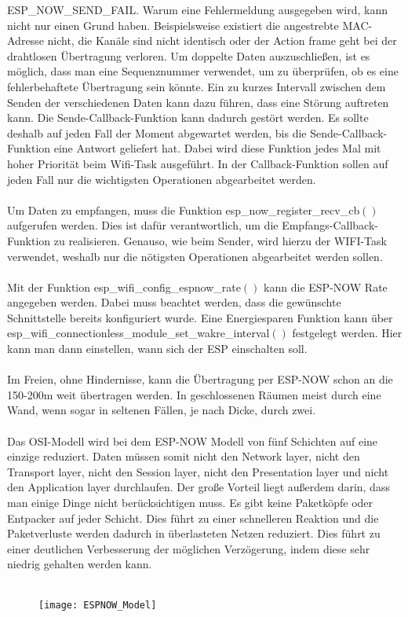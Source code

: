 \documentclass[titlepage,12pt,twoside]{article}
\begin{document}
ESP\_NOW\_SEND\_FAIL. Warum eine Fehlermeldung ausgegeben wird, kann nicht 
nur einen Grund haben. Beispielsweise existiert die angestrebte MAC-Adresse 
nicht, die Kanäle sind nicht identisch oder der Action frame geht bei der 
drahtlosen Übertragung verloren. Um doppelte Daten auszuschließen, ist es 
möglich, dass man eine Sequenznummer verwendet, um zu überprüfen, ob es eine 
fehlerbehaftete Übertragung sein könnte. Ein zu kurzes Intervall zwischen 
dem Senden der verschiedenen Daten kann dazu führen, dass eine Störung 
auftreten kann. Die Sende-Callback-Funktion kann dadurch gestört werden. Es 
sollte deshalb auf jeden Fall der Moment abgewartet werden, bis die Sende-Callback-Funktion 
eine Antwort geliefert hat. Dabei wird diese Funktion jedes Mal mit hoher 
Priorität beim Wifi-Task ausgeführt. In der Callback-Funktion sollen auf 
jeden Fall nur die wichtigsten Operationen abgearbeitet werden. \\
\\
Um Daten zu empfangen, muss die Funktion esp\_now\_register\_recv\_cb$()$ aufgerufen 
werden. Dies ist dafür verantwortlich, um die Empfangs-Callback-Funktion zu 
realisieren. Genauso, wie beim Sender, wird hierzu der WIFI-Task verwendet, 
weshalb nur die nötigsten Operationen abgearbeitet werden sollen. \\
\\
Mit der Funktion esp\_wifi\_config\_espnow\_rate$()$ kann die ESP-NOW Rate angegeben 
werden. Dabei muss beachtet werden, dass die gewünschte Schnittstelle bereits 
konfiguriert wurde. Eine Energiesparen Funktion kann über 
esp\_wifi\_connectionless\_module\_set\_wakre\_interval$()$ festgelegt werden. Hier 
kann man dann einstellen, wann sich der ESP einschalten soll. \\
\\
Im Freien, ohne Hindernisse, kann die Übertragung per ESP-NOW schon an die 
150-200m weit übertragen werden. In geschlossenen Räumen meist durch eine 
Wand, wenn sogar in seltenen Fällen, je nach Dicke, durch zwei. \\
\\
Das OSI-Modell wird bei dem ESP-NOW Modell von fünf Schichten auf eine 
einzige reduziert. Daten müssen somit nicht den Network layer, nicht den 
Transport layer, nicht den Session layer, nicht den Presentation layer und 
nicht den Application layer durchlaufen. Der große Vorteil liegt außerdem 
darin, dass man einige Dinge nicht berücksichtigen muss. Es gibt keine 
Paketköpfe oder Entpacker auf jeder Schicht. Dies führt zu einer schnelleren 
Reaktion und die Paketverluste werden dadurch in überlasteten Netzen 
reduziert. Dies führt zu einer deutlichen Verbesserung der möglichen 
Verzögerung, indem diese sehr niedrig gehalten werden kann. \\
\\
\begin{figure}[H]
	\begin{center}
		\scalebox{1.0}
		{\texttt{[image: ESPNOW\_Model]}}
	\end{center}
\end{figure}
\end{document}
